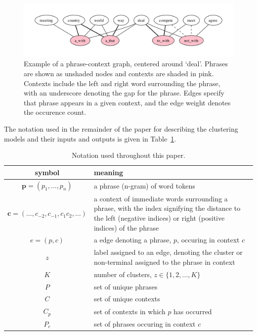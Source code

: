 \begin{figure}
\includegraphics[width=\textwidth]{deal}
\caption{Example of a phrase-context graph, centered around `deal'. Phrases are shown as unshaded nodes and contexts are shaded in pink. Contexts include the left and right word surrounding the phrase, with an underscore denoting the gap for the phrase. Edges specify that phrase appears in a given context, and the edge weight denotes the occurence count.}
\label{fig:bipartite}
\end{figure}

The notation used in the remainder of the paper for describing the clustering models and their inputs and outputs is given in Table~\ref{tab:notation}.

\begin{table}
\begin{tabular}{cp{}}
\toprule
  symbol & meaning \\
\midrule
  $\mathbf{p} = (p_1, \ldots, p_n)$ & a phrase (n-gram) of word tokens \\
  $\mathbf{c} = (\ldots, c_{-2}, c_{-1}, c_1 c_2, \ldots)$ & a context of immediate words surrounding a phrase, with the index signifying the distance to the left (negative indices) or right (positive indices) of the phrase \\
  $e = (p, c)$  & a edge denoting a phrase, $p$, occuring in context $c$ \\
  $z$ & label assigned to an edge, denoting the cluster or non-terminal assigned to the phrase in context \\
  $K$ & number of clusters, $z \in \{1,2, \ldots, K\}$ \\
  $P$ & set of unique phrases \\
  $C$ & set of unique contexts \\
  $C_p$ & set of contexts in which $p$ has occurred \\
  $P_c$ & set of phrases occuring in context $c$ \\
\bottomrule
\end{tabular}
\caption{Notation used throughout this paper.}
\label{tab:notation}
\end{table}

